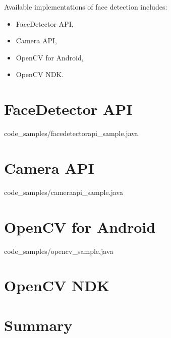 \documentclass[]{mgr} %
\begin{document}
Available implementations of face detection includes:
\begin{itemize}
  \item FaceDetector API,
  \item Camera API,
  \item OpenCV for Android,
  \item OpenCV NDK.
\end{itemize}


\section{FaceDetector API}


{code_samples/facedetectorapi_sample.java}


\section{Camera API}


{code_samples/cameraapi_sample.java}

\section{OpenCV for Android}


{code_samples/opencv_sample.java}


\section{OpenCV NDK}

\section{Summary}
\end{document}
